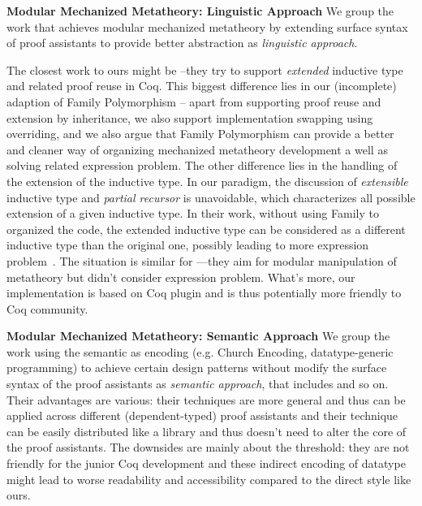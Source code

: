 \ifShowOldWriting

\textbf{Modular Mechanized Metatheory: Linguistic Approach} We group the work that achieves modular mechanized metatheory by extending surface syntax of proof assistants to provide better abstraction as \textit{linguistic approach}. 

The closest work to ours might be \citet{boite2004proof}--they try to support \textit{extended} inductive type and related proof reuse in Coq. This biggest difference lies in our (incomplete) adaption of Family Polymorphism -- apart from supporting proof reuse and extension by inheritance, we also support implementation swapping using overriding, and we also argue that Family Polymorphism can provide a better and cleaner way of organizing mechanized metatheory development a well as solving related expression problem. The other difference lies in the handling of the extension of the inductive type. In our paradigm, the discussion of \textit{extensible} inductive type and \textit{partial recursor} is unavoidable, which characterizes all possible extension of a given inductive type. In their work, without using Family to organized the code, the extended inductive type can be considered as a different inductive type than the original one, possibly leading to more expression problem~\cite{wadler-ep}. The situation is similar for \citet{levin2003tinkertype}---they aim for modular manipulation of metatheory but didn't consider expression problem.  What's more, our implementation is based on Coq plugin and is thus potentially more friendly to Coq community.


\textbf{Modular Mechanized Metatheory: Semantic Approach} We group the work using the semantic as encoding (e.g. Church Encoding, datatype-generic programming) to achieve certain design patterns without modify the surface syntax of the proof assistants as \textit{semantic approach}, that includes \citet{delaware2013,forsta2020,liwei2022,schwaab2013modular, keuchel2013generic} and so on. Their advantages are various: their techniques are more general and thus can be applied across different (dependent-typed) proof assistants and their technique can be easily distributed like a library and thus doesn't need to alter the core of the proof assistants. The downsides are mainly about the threshold: they are not friendly for the junior Coq development and these indirect encoding of datatype might lead to worse readability and accessibility compared to the direct style like ours.

\fi